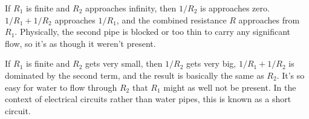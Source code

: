 If $R_1$ is finite and $R_2$ approaches infinity, then $1/R_2$ is approaches zero.
$1/R_1+1/R_2$ approaches $1/R_1$, and the combined resistance $R$ approaches
from $R_1$. Physically, the second pipe is blocked or too thin to carry any significant flow,
so it's as though it weren't present.

If $R_1$ is finite and $R_2$ gets very small, then $1/R_2$ gets very big, $1/R_1+1/R_2$ is
dominated by the second term, and the result is basically the same as $R_2$.
It's so easy for water to
flow through $R_2$ that $R_1$ might as well not be present. In the context of electrical circuits
rather than water pipes, this is known as a short circuit.

